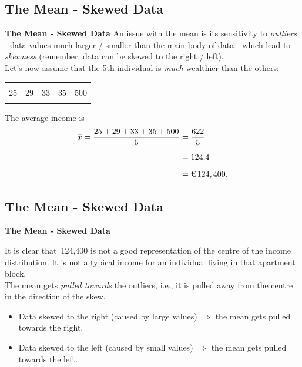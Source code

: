 \documentclass[compress]{beamer}        %
\makeatletter
\newcommand{\tcb}{\textcolor{beamer@blendedblue}}
\makeatother
\begin{document}
\subsection{The Mean - Skewed Data}
\begin{frame}{\bf \tcb{The Mean - Skewed Data}}
An issue with the mean is its sensitivity to \emph{outliers} - data values much larger / smaller than the main body of data - which lead to \emph{skewness} (remember: data can be skewed to the right / left).\\[0.4cm]
Let's now assume that the 5th individual is \emph{much} wealthier than the others:
\begin{center}
\begin{tabular}{|ccccc|}
\hline
&&&&\\[-0.4cm]
25 & 29 & 33 & 35 & 500 \\
\hline
\multicolumn{5}{c}{}\\
\end{tabular}
\end{center}
The average income is
\begin{align*}
\bar x = \frac{25 + 29 + 33 + 35 + 500}{5} &= \frac{622}{5} \\[0.2cm]
&= 124.4 \\[0.2cm]
&= \text{\texteuro\,} 124,400.
\end{align*}


\end{frame}


\subsection{The Mean - Skewed Data}
\begin{frame}{\bf \tcb{The Mean - Skewed Data}}

It is clear that \texteuro\,124,400 is not a good representation of the centre of the income distribution. It is not a typical income for an individual living in that apartment block.\\[0.6cm]

The mean gets \emph{pulled towards} the outliers, i.e., it is pulled away from the centre in the direction of the skew.\\[0.3cm]
\begin{itemize}\itemsep0.5cm
\item Data skewed to the right (caused by large values) \newline\phantom{\quad}$\Rightarrow$ the mean gets pulled towards the right.\\[0.4cm]
\item Data skewed to the left (caused by small values) \newline\phantom{\quad}$\Rightarrow$ the mean gets pulled towards the left.
\end{itemize}

\end{frame}
\end{document}
